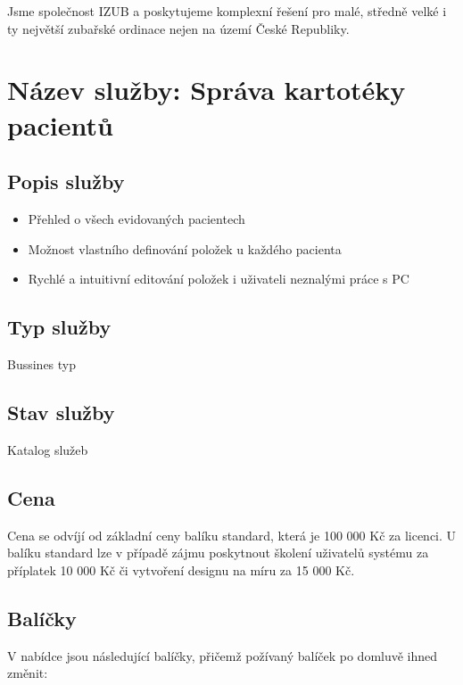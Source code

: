 \documentclass[12pt, a4paper, titlepage]{article}
\begin{document}
	\vspace{1em}

	\noindent Jsme společnost IZUB a poskytujeme komplexní řešení pro malé, středně velké i ty největší zubařské ordinace nejen na území České Republiky.
	\vspace{1em}

	\noindent\makebox[\linewidth]{\rule{16cm}{0.4pt}}

	\vspace{2em}

	\section*{Název služby: Správa kartotéky pacientů}

	\subsection*{Popis služby}
	\begin{itemize}
		\item Přehled o všech evidovaných pacientech
		\item Možnost vlastního definování položek u každého pacienta
		\item Rychlé a intuitivní editování položek i uživateli neznalými práce s PC
	\end{itemize}

	\subsection*{Typ služby}

	Bussines typ

	\subsection*{Stav služby}

	Katalog služeb

	\subsection*{Cena}
	\noindent Cena se odvíjí od základní ceny balíku standard, která je 100 000 Kč za licenci. U balíku standard lze v případě zájmu poskytnout školení uživatelů systému za příplatek 10 000 Kč či vytvoření designu na míru za 15 000 Kč.

	\subsection*{Balíčky}
	V nabídce jsou následující balíčky, přičemž požívaný balíček po domluvě ihned změnit:
\end{document}

